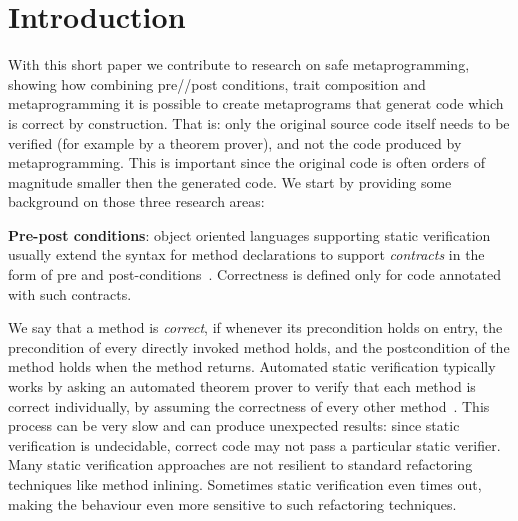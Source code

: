 \section{Introduction}
With this short paper we contribute
to research on safe metaprogramming, showing how combining 
pre//post conditions,
trait composition and metaprogramming
it is possible to create metaprograms that generat code which is correct by construction.
That is: only the original source code itself needs to be verified (for example by a theorem prover), and not the code produced by metaprogramming.
This is important since the original code is often orders of magnitude smaller then the generated code.
We start by providing some background on those three research areas:

\textbf{Pre-post conditions}:
object oriented languages supporting static verification usually extend the syntax for method declarations
to support \emph{contracts} in the form of pre and post-conditions~\cite{Meyer:1988:OSC:534929}.
Correctness is defined only for code annotated with such contracts.

We say that a method is \emph{correct}, if whenever its precondition holds on entry, the precondition of every directly invoked method holds, and the postcondition of the method holds when the method returns. Automated static verification typically works by asking an automated theorem prover to verify that each method is correct individually, by assuming the correctness of every other method~\cite{barnett2004spec}. This process can be very slow and can produce unexpected results: since static verification is undecidable, correct code may not pass a particular static verifier.
Many static verification approaches are not resilient to
standard refactoring techniques like 
method inlining. Sometimes static verification even times out, making the behaviour even more sensitive to such refactoring techniques.



